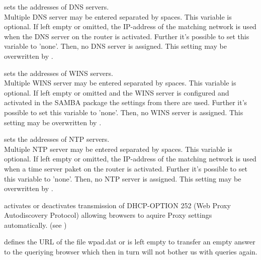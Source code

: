 \begin{description}

    {sets the addresses of DNS servers. \\
    Multiple DNS server may be entered separated by spaces. 
    This variable is optional. If left empty or omitted, the IP-address of the
    matching network is used when the DNS server on the router is activated. 
    Further it's possible to set this variable to 'none'. Then, no DNS server is assigned.
    This setting may be overwritten by
    .}
    

    {sets the addresses of WINS servers. \\
    Multiple WINS server may be entered separated by spaces. 
    This variable is optional. If left empty or omitted and the WINS server is configured and
    activated in the SAMBA package the settings from there are used.
    Further it's possible to set this variable to 'none'. Then, no WINS server is assigned.
    This setting may be overwritten by
    .}

    
    {sets the addresses of NTP servers. \\
    Multiple NTP server may be entered separated by spaces. 
    This variable is optional. If left empty or omitted, the IP-address of the
    matching network is used when a time server paket on the router is activated.
    Further it's possible to set this variable to 'none'. Then, no NTP server is assigned.
    This setting may be overwritten by
    .}
    

     {activates or deactivates transmission of DHCP-OPTION 252 (Web Proxy Autodiscovery Protocol)
     allowing browsers to aquire Proxy settings automatically.
     (see )
     }


     {defines the URL of the file wpad.dat or is left empty to transfer an empty answer to
     the queriying browser which then in turn will not bother us with queries again.
     }

\end{description}
